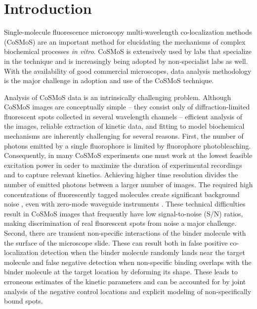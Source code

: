 \section{Introduction}

Single-molecule fluorescence microscopy multi-wavelength co-localization methods (CoSMoS) are an important method for elucidating the mechanisms of complex biochemical processes \textit{in vitro}. CoSMoS is extensively used by labs that specialize in the technique and is increasingly being adopted by non-specialist labs as well. With the availability of good commercial microscopes, data analysis methodology is the major challenge in adoption and use of the CoSMoS technique.

Analysis of CoSMoS data is an intrinsically challenging problem. Although CoSMoS images are conceptually simple -- they consist only of diffraction-limited fluorescent spots collected in several wavelength channels -- efficient analysis of the images, reliable extraction of kinetic data, and fitting to model biochemical mechanisms are inherently challenging for several reasons. First, the number of photons emitted by a single fluorophore is limited by fluorophore photobleaching. Consequently, in many CoSMoS experiments one must work at the lowest feasible excitation power in order to maximize the duration of experimental recordings and to capture relevant kinetics. Achieving higher time resolution divides the number of emitted photons between a larger number of images. The required high concentrations of fluorescently tagged molecules create significant background noise \citep{peng_breaking_nodate, van_oijen_single-molecule_2011}, even with zero-mode waveguide instruments \citep{chen_high-throughput_2014}. These technical difficulties result in CoSMoS images that frequently have low signal-to-noise (S/N) ratios, making discrimination of real fluorescent spots from noise a major challenge. Second, there are transient non-specific interactions of the binder molecule with the surface of the microscope slide. These can result both in false positive co-localization detection when the binder molecule randomly lands near the target molecule and false negative detection when non-specific binding overlaps with the binder molecule at the target location by deforming its shape. These leads to erroneous estimates of the kinetic parameters and can be accounted for by joint analysis of the negative control locations and explicit modeling of non-specifically bound spots.

